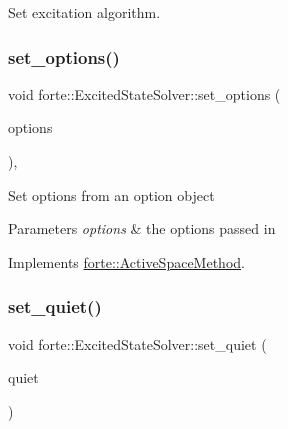 Set excitation algorithm. 

\mbox{\label{classforte_1_1_excited_state_solver_ac32716228ebaa1dfda75cf48db544e5f}} 
\subsubsection{\texorpdfstring{set\+\_\+options()}{set\_options()}}
{\footnotesize\ttfamily void forte\+::\+Excited\+State\+Solver\+::set\+\_\+options (\begin{DoxyParamCaption}\item[{std\+::shared\+\_\+ptr$<$ \mbox{\hyperlink{classforte_1_1_forte_options}{Forte\+Options}} $>$}]{options }\end{DoxyParamCaption})\hspace{0.3cm}{\ttfamily [override]}, {\ttfamily [virtual]}}

Set options from an option object 
\begin{DoxyParams}{Parameters}
{\em options} & the options passed in \\
\hline
\end{DoxyParams}


Implements \mbox{\hyperlink{classforte_1_1_active_space_method_a9416a627f550d4d56f6b8ffe7478ed89}{forte\+::\+Active\+Space\+Method}}.

\mbox{\label{classforte_1_1_excited_state_solver_a17b7c4372d65beda0704a9fb94e358aa}} 
\subsubsection{\texorpdfstring{set\+\_\+quiet()}{set\_quiet()}}
{\footnotesize\ttfamily void forte\+::\+Excited\+State\+Solver\+::set\+\_\+quiet (\begin{DoxyParamCaption}\item[{bool}]{quiet }\end{DoxyParamCaption})}



